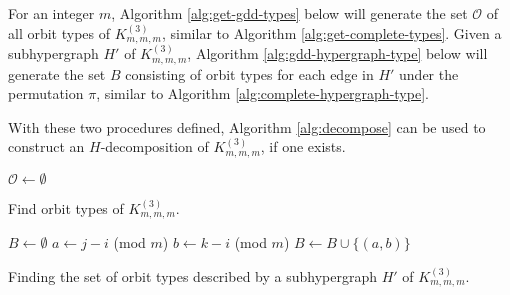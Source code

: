 For an integer $m$, Algorithm \ref{alg:get-gdd-types} below will generate the set $\mathcal{O}$ of all orbit types of $K_{m,m,m}^{(3)}$, similar to Algorithm \ref{alg:get-complete-types}.
Given a subhypergraph $H'$ of $K_{m,m,m}^{(3)}$, Algorithm \ref{alg:gdd-hypergraph-type} below will generate the set $B$ consisting of orbit types for each edge in $H'$ under the permutation $\pi$, similar to Algorithm \ref{alg:complete-hypergraph-type}.

With these two procedures defined, Algorithm \ref{alg:decompose} can be used to construct an $H$-decomposition of $K_{m,m,m}^{(3)}$, if one exists.


\begin{algorithm}

$\mathcal{O} \gets \emptyset$\;


\;

\caption{Find orbit types of $K_{m,m,m}^{(3)}$.} \label{alg:get-gdd-types}
\end{algorithm}

\begin{algorithm}
$B \gets \emptyset$\;
 {
    $a \gets j-i$ (mod $m$)\;
    $b \gets k-i$ (mod $m$)\;
    $B \gets B \cup \{(a, b)\}$\;
}
\;
\caption{Finding the set of orbit types described by a subhypergraph $H'$ of $K_{m,m,m}^{(3)}$.} \label{alg:gdd-hypergraph-type}
\end{algorithm}

\newpage
